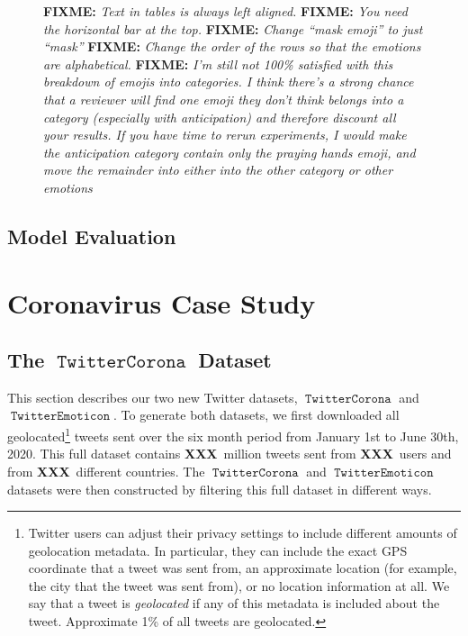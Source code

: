 \documentclass[11pt]{article}
\newcommand{\defn}[1]{\emph{{#1}}}
\newcommand{\fixme}[1]{{\color{red} \textbf{FIXME:} {\textit {#1}}}}
\newcommand{\XXX}{\textbf{XXX}~}
\DeclareMathOperator{\emoticon}{\texttt{TwitterEmoticon}}
\DeclareMathOperator{\corona}{\texttt{TwitterCorona}}
\begin{document}
\begin{figure}
{        \fixme{
            Text in tables is always left aligned.
        }
        \fixme{
            You need the horizontal bar at the top.
        }
        \fixme{
            Change ``mask emoji'' to just ``mask''
        }
        \fixme{
            Change the order of the rows so that the emotions are alphabetical.
        }
        \fixme{
            I'm still not 100\% satisfied with this breakdown of emojis into categories.
            I think there's a strong chance that a reviewer will find one emoji they don't think belongs into a category (especially with anticipation) and therefore discount all your results.
            If you have time to rerun experiments,
            I would make the anticipation category contain only the praying hands emoji,
            and move the remainder into either into the other category or other emotions
        }
    }
    \label{fig:Mapped_emojis}%
\end{figure}


\subsection{Model Evaluation}


\section{Coronavirus Case Study}

\subsection{The $\corona$ Dataset}

This section describes our two new Twitter datasets, $\corona$ and $\emoticon$.
To generate both datasets,
we first downloaded all geolocated\footnote{%
Twitter users can adjust their privacy settings to include different amounts of geolocation metadata.
In particular, they can include the exact GPS coordinate that a tweet was sent from,
an approximate location (for example, the city that the tweet was sent from),
or no location information at all.
We say that a tweet is \defn{geolocated} if any of this metadata is included about the tweet.
Approximate 1\% of all tweets are geolocated.
} 
tweets sent over the six month period from January 1st to June 30th, 2020.
This full dataset contains \XXX million tweets sent from \XXX users and from \XXX different countries.
The $\corona$ and $\emoticon$ datasets were then constructed by filtering this full dataset in different ways.
\end{document}
